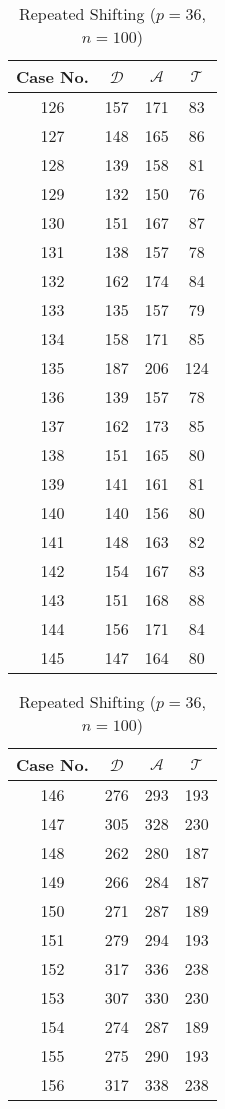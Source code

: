 
\begin{table}[!htb]
\parbox{.45\linewidth}{
\centering
\begin{tabular}{|c|c|c|c|}
\hline
Case No. & $\mathcal{D}$ & $\mathcal{A}$ & $\mathcal{T}$ \\
\hline
126 & 157 & 171 & 83  \\
127 & 148 & 165 & 86  \\
128 & 139 & 158 & 81  \\
129 & 132 & 150 & 76  \\
130 & 151 & 167 & 87  \\
131 & 138 & 157 & 78  \\
132 & 162 & 174 & 84  \\
133 & 135 & 157 & 79  \\
134 & 158 & 171 & 85  \\
135 & 187 & 206 & 124 \\
136 & 139 & 157 & 78  \\
137 & 162 & 173 & 85  \\
138 & 151 & 165 & 80  \\
139 & 141 & 161 & 81  \\
140 & 140 & 156 & 80  \\
141 & 148 & 163 & 82  \\
142 & 154 & 167 & 83  \\
143 & 151 & 168 & 88  \\
144 & 156 & 171 & 84  \\
145 & 147 & 164 & 80  \\
\hline
\end{tabular}
\caption{Repeated Shifting ($p=36$, $n=100$)}
\label{tab:dat-20}
}
\hfill
\parbox{.45\linewidth}{
\centering
\begin{tabular}{|c|c|c|c|}
\hline
Case No. & $\mathcal{D}$ & $\mathcal{A}$ & $\mathcal{T}$ \\
\hline
146 & 276 & 293 & 193 \\
147 & 305 & 328 & 230 \\
148 & 262 & 280 & 187 \\
149 & 266 & 284 & 187 \\
150 & 271 & 287 & 189 \\
151 & 279 & 294 & 193 \\
152 & 317 & 336 & 238 \\
153 & 307 & 330 & 230 \\
154 & 274 & 287 & 189 \\
155 & 275 & 290 & 193 \\
156 & 317 & 338 & 238 \\

\end{tabular}}
\end{table}
